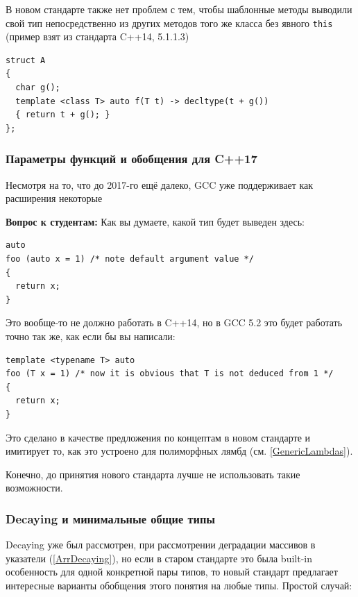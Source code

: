 \documentclass[a4paper,12pt,oneside]{article}
\newif\ifanswers
\begin{document}
В новом стандарте также нет проблем с тем, чтобы шаблонные методы выводили свой тип непосредственно из других методов того же класса без явного \lstinline!this! (пример взят из стандарта C++14, 5.1.1.3)

\begin{lstlisting}
struct A 
{
  char g();
  template <class T> auto f(T t) -> decltype(t + g())
  { return t + g(); }
};
\end{lstlisting}

\subsubsection{Параметры функций и обобщения для C++17}\label{DecltypeAuto17}

Несмотря на то, что до 2017-го ещё далеко, GCC уже поддерживает как расширения некоторые

\textbf{Вопрос к студентам:} Как вы думаете, какой тип будет выведен здесь: 
\begin{lstlisting}
auto 
foo (auto x = 1) /* note default argument value */
{
  return x;
}
\end{lstlisting}

\ifanswers
Правильный ответ: этот код не должен вводить вас в заблуждение: тип для \lstinline!x! выводится из типа в точке вызова, а не из аргумента по умолчанию
\fi

Это вообще-то не должно работать в C++14, но в GCC 5.2 это будет работать точно так же, как если бы вы написали:

\begin{lstlisting}
template <typename T> auto 
foo (T x = 1) /* now it is obvious that T is not deduced from 1 */
{
  return x;
}
\end{lstlisting}

Это сделано в качестве предложения по концептам в новом стандарте и имитирует то, как это устроено для полиморфных лямбд (см. \ref{GenericLambdas}).

Конечно, до принятия нового стандарта лучше не использовать такие возможности.

\subsubsection{Decaying и минимальные общие типы}\label{Decaying}

Decaying уже был рассмотрен, при рассмотрении деградации массивов в указатели (\ref{ArrDecaying}), но если в старом стандарте это была built-in особенность для одной конкретной пары типов, то новый стандарт предлагает интересные варианты обобщения этого понятия на любые типы. Простой случай:
\end{document}
